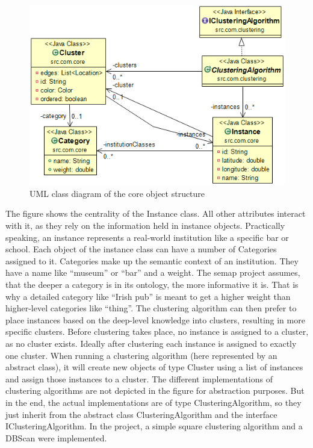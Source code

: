 \begin{figure}
  \centering
    \includegraphics[scale=0.8]{./content/cos.png}
  \caption{UML class diagram of the core object structure}\label{fig:cos}
\end{figure}


The figure shows the centrality of the Instance class. All other attributes interact with it, as they rely on the information held in instance objects. Practically speaking, an instance represents a real-world institution like a specific bar or school. Each object of the instance class can have a number of Categories assigned to it. Categories make up the semantic context of an institution. They have a name like “museum” or “bar” and a weight. The semap project assumes, that the deeper a category is in its ontology, the more informative it is. That is why a detailed category like “Irish pub” is meant to get a higher weight than higher-level categories like “thing”. The clustering algorithm can then prefer to place instances based on the deep-level knowledge into clusters, resulting in more specific clusters.
Before clustering takes place, no instance is assigned to a cluster, as no cluster exists. Ideally after clustering each instance is assigned to exactly one cluster. When running a clustering algorithm (here represented by an abstract class), it will create new objects of type Cluster using a list of instances and assign those instances to a cluster. The different implementations of clustering algorithms are not depicted in the figure for abstraction purposes. But in the end, the actual implementations are of type ClusteringAlgorithm, so they just inherit from the abstract class ClusteringAlgorithm and the interface IClusteringAlgorithm. In the project, a simple square clustering algorithm and a DBScan were implemented.


